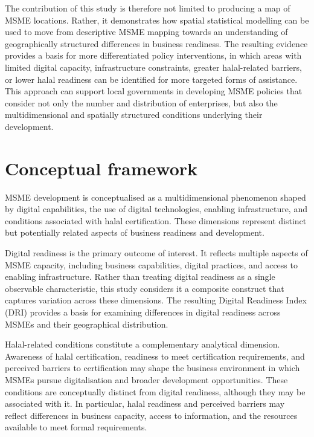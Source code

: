 \documentclass[
  default,
]{sn-jnl}
\begin{document}
The contribution of this study is therefore not limited to producing a
map of MSME locations. Rather, it demonstrates how spatial statistical
modelling can be used to move from descriptive MSME mapping towards an
understanding of geographically structured differences in business
readiness. The resulting evidence provides a basis for more
differentiated policy interventions, in which areas with limited digital
capacity, infrastructure constraints, greater halal-related barriers, or
lower halal readiness can be identified for more targeted forms of
assistance. This approach can support local governments in developing
MSME policies that consider not only the number and distribution of
enterprises, but also the multidimensional and spatially structured
conditions underlying their development.

\section{Conceptual framework}\label{conceptual-framework}

MSME development is conceptualised as a multidimensional phenomenon
shaped by digital capabilities, the use of digital technologies,
enabling infrastructure, and conditions associated with halal
certification. These dimensions represent distinct but potentially
related aspects of business readiness and development.

Digital readiness is the primary outcome of interest. It reflects
multiple aspects of MSME capacity, including business capabilities,
digital practices, and access to enabling infrastructure. Rather than
treating digital readiness as a single observable characteristic, this
study considers it a composite construct that captures variation across
these dimensions. The resulting Digital Readiness Index (DRI) provides a
basis for examining differences in digital readiness across MSMEs and
their geographical distribution.

Halal-related conditions constitute a complementary analytical
dimension. Awareness of halal certification, readiness to meet
certification requirements, and perceived barriers to certification may
shape the business environment in which MSMEs pursue digitalisation and
broader development opportunities. These conditions are conceptually
distinct from digital readiness, although they may be associated with
it. In particular, halal readiness and perceived barriers may reflect
differences in business capacity, access to information, and the
resources available to meet formal requirements.
\end{document}
